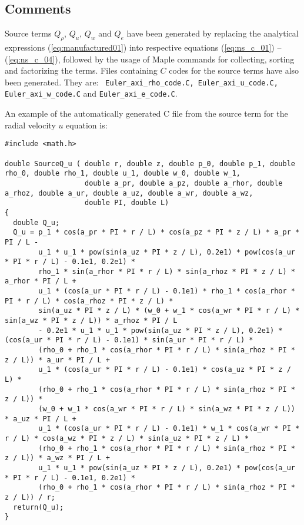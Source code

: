 \documentclass[a4paper,10pt]{article}
\begin{document}
\begin{landscape}
\section{Comments}


Source terms $Q_{\rho}$,  $Q_u$, $Q_w$ and  $Q_e$ have been generated by replacing the analytical expressions (\ref{eq:manufactured01}) into  respective equations (\ref{eq:ns_c_01}) -- (\ref{eq:ns_c_04}), followed by the usage of Maple commands for collecting, sorting and factorizing the terms. Files containing  $C$ codes for the source terms have also been generated. They are: \texttt{ Euler\_axi\_rho\_code.C, Euler\_axi\_u\_code.C, Euler\_axi\_w\_code.C} and \texttt{Euler\_axi\_e\_code.C}.

\newpage
An example of the automatically generated C file from the source term for the radial velocity $u$ equation is:
\begin{verbatim}
#include <math.h>

double SourceQ_u ( double r, double z, double p_0, double p_1, double rho_0, double rho_1, double u_1, double w_0, double w_1,
                   double a_pr, double a_pz, double a_rhor, double a_rhoz, double a_ur, double a_uz, double a_wr, double a_wz,
                   double PI, double L)
{
  double Q_u;
  Q_u = p_1 * cos(a_pr * PI * r / L) * cos(a_pz * PI * z / L) * a_pr * PI / L -
        u_1 * u_1 * pow(sin(a_uz * PI * z / L), 0.2e1) * pow(cos(a_ur * PI * r / L) - 0.1e1, 0.2e1) *
        rho_1 * sin(a_rhor * PI * r / L) * sin(a_rhoz * PI * z / L) * a_rhor * PI / L +
        u_1 * (cos(a_ur * PI * r / L) - 0.1e1) * rho_1 * cos(a_rhor * PI * r / L) * cos(a_rhoz * PI * z / L) *
        sin(a_uz * PI * z / L) * (w_0 + w_1 * cos(a_wr * PI * r / L) * sin(a_wz * PI * z / L)) * a_rhoz * PI / L
        - 0.2e1 * u_1 * u_1 * pow(sin(a_uz * PI * z / L), 0.2e1) * (cos(a_ur * PI * r / L) - 0.1e1) * sin(a_ur * PI * r / L) *
        (rho_0 + rho_1 * cos(a_rhor * PI * r / L) * sin(a_rhoz * PI * z / L)) * a_ur * PI / L +
        u_1 * (cos(a_ur * PI * r / L) - 0.1e1) * cos(a_uz * PI * z / L) *
        (rho_0 + rho_1 * cos(a_rhor * PI * r / L) * sin(a_rhoz * PI * z / L)) *
        (w_0 + w_1 * cos(a_wr * PI * r / L) * sin(a_wz * PI * z / L)) * a_uz * PI / L +
        u_1 * (cos(a_ur * PI * r / L) - 0.1e1) * w_1 * cos(a_wr * PI * r / L) * cos(a_wz * PI * z / L) * sin(a_uz * PI * z / L) *
        (rho_0 + rho_1 * cos(a_rhor * PI * r / L) * sin(a_rhoz * PI * z / L)) * a_wz * PI / L +
        u_1 * u_1 * pow(sin(a_uz * PI * z / L), 0.2e1) * pow(cos(a_ur * PI * r / L) - 0.1e1, 0.2e1) *
        (rho_0 + rho_1 * cos(a_rhor * PI * r / L) * sin(a_rhoz * PI * z / L)) / r;
  return(Q_u);
}
\end{verbatim}
 


\end{landscape}
\end{document}

